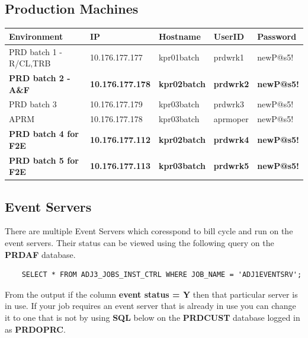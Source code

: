 \documentclass[12pt,twoside]{article}
\begin{document}
\subsection{Production Machines}
\label{sec-3-3}

\footnotesize

\begin{center}
\begin{tabular}{lllll}
\hline
 \textbf{Environment}          &  \textbf{IP}              &  \textbf{Hostname}    &  \textbf{UserID}   &  \textbf{Password}  \\
\hline
 PRD batch 1 - R/CL,TRB        &  10.176.177.177           &  kpr01batch           &  prdwrk1           &  newP@s5!           \\
 \textbf{PRD batch 2 - A\&F}   &  \textbf{10.176.177.178}  &  \textbf{kpr02batch}  &  \textbf{prdwrk2}  &  \textbf{newP@s5!}  \\
 PRD batch 3                   &  10.176.177.179           &  kpr03batch           &  prdwrk3           &  newP@s5!           \\
 APRM                          &  10.176.177.178           &  kpr03batch           &  aprmoper          &  newP@s5!           \\
 \textbf{PRD batch 4 for F2E}  &  \textbf{10.176.177.112}  &  \textbf{kpr02batch}  &  \textbf{prdwrk4}  &  \textbf{newP@s5!}  \\
 \textbf{PRD batch 5 for F2E}  &  \textbf{10.176.177.113}  &  \textbf{kpr03batch}  &  \textbf{prdwrk5}  &  \textbf{newP@s5!}  \\
\hline
\end{tabular}
\end{center}


\normalsize
\subsection{Event Servers}
\label{sec-3-4}

   There are multiple Event Servers which coresspond to bill cycle and run on the event servers.   
   Their status can be viewed using the following query on the \textbf{PRDAF} database. 
\begin{verbatim}
    SELECT * FROM ADJ3_JOBS_INST_CTRL WHERE JOB_NAME = 'ADJ1EVENTSRV';
\end{verbatim}
   From the output if the column \textbf{event status = Y} then that particular server is in use. 
   If your job requires an event server that is already in use you can change it to one that is not by using \textbf{SQL} below on the \textbf{PRDCUST} database logged in as \textbf{PRDOPRC}. 
\end{document}
